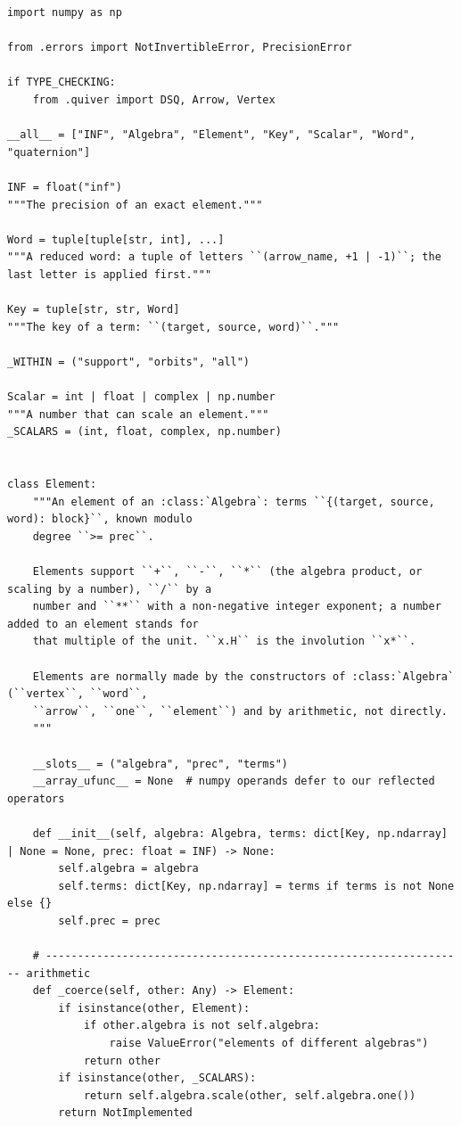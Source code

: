 \documentclass[12pt, a4paper]{report}
\theoremstyle{plain}
\theoremstyle{definition}
\theoremstyle{remark}
\theoremstyle{plain}
\begin{document}
\begin{lstlisting}[style=dsqcode]
import numpy as np

from .errors import NotInvertibleError, PrecisionError

if TYPE_CHECKING:
    from .quiver import DSQ, Arrow, Vertex

__all__ = ["INF", "Algebra", "Element", "Key", "Scalar", "Word", "quaternion"]

INF = float("inf")
"""The precision of an exact element."""

Word = tuple[tuple[str, int], ...]
"""A reduced word: a tuple of letters ``(arrow_name, +1 | -1)``; the last letter is applied first."""

Key = tuple[str, str, Word]
"""The key of a term: ``(target, source, word)``."""

_WITHIN = ("support", "orbits", "all")

Scalar = int | float | complex | np.number
"""A number that can scale an element."""
_SCALARS = (int, float, complex, np.number)


class Element:
    """An element of an :class:`Algebra`: terms ``{(target, source, word): block}``, known modulo
    degree ``>= prec``.

    Elements support ``+``, ``-``, ``*`` (the algebra product, or scaling by a number), ``/`` by a
    number and ``**`` with a non-negative integer exponent; a number added to an element stands for
    that multiple of the unit. ``x.H`` is the involution ``x*``.

    Elements are normally made by the constructors of :class:`Algebra` (``vertex``, ``word``,
    ``arrow``, ``one``, ``element``) and by arithmetic, not directly.
    """

    __slots__ = ("algebra", "prec", "terms")
    __array_ufunc__ = None  # numpy operands defer to our reflected operators

    def __init__(self, algebra: Algebra, terms: dict[Key, np.ndarray] | None = None, prec: float = INF) -> None:
        self.algebra = algebra
        self.terms: dict[Key, np.ndarray] = terms if terms is not None else {}
        self.prec = prec

    # ------------------------------------------------------------------ arithmetic
    def _coerce(self, other: Any) -> Element:
        if isinstance(other, Element):
            if other.algebra is not self.algebra:
                raise ValueError("elements of different algebras")
            return other
        if isinstance(other, _SCALARS):
            return self.algebra.scale(other, self.algebra.one())
        return NotImplemented


\end{lstlisting}
\end{document}
